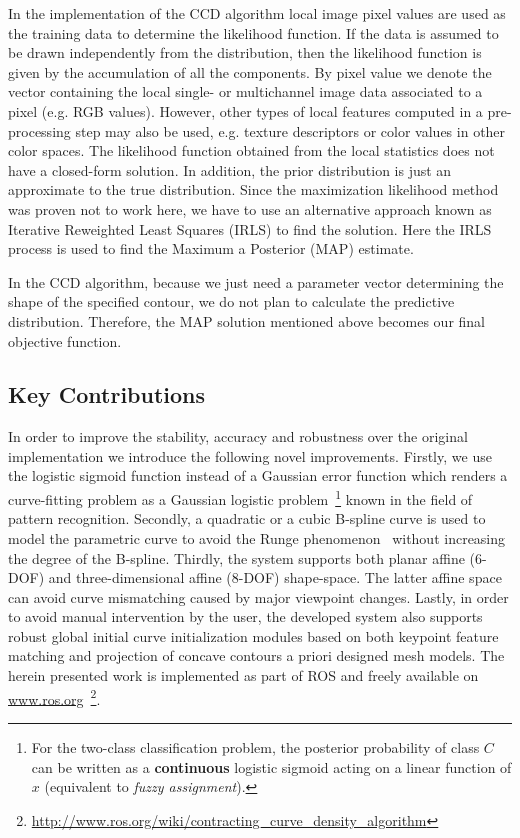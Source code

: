\documentclass[conference]{IEEEtran}
\begin{document}
In the implementation of the CCD algorithm local image pixel values are used
as the training data to determine the likelihood function. If the data is 
assumed to be drawn independently from the distribution, then the likelihood 
function is given by the accumulation of all the components.
By pixel value we denote the vector containing the local single- or multichannel
image data associated to a pixel (e.g. RGB values). 
However, other types of local features computed in a pre-processing
step may also be used, e.g. texture descriptors or color values in
other color spaces. The likelihood function obtained from the local statistics does
not have a closed-form solution. In addition, the prior distribution is just
an approximate to the true distribution. Since the maximization
likelihood method was proven \cite{bishop2006pattern} not to work here, we have to use an alternative
approach known as Iterative Reweighted Least Squares (IRLS) to find
the solution. Here the IRLS process is used to find the Maximum a Posterior (MAP)
estimate.

In the CCD algorithm, because we just need a parameter vector determining
the shape of the specified contour, we do not plan to calculate the
predictive distribution. Therefore, the MAP solution mentioned above
becomes our final objective function.


\subsection{Key Contributions}
In order to improve the stability, accuracy and robustness over the original
implementation we introduce the following novel improvements. Firstly, we use 
the logistic sigmoid function instead of a Gaussian error function which renders a
curve-fitting problem as a Gaussian logistic problem~\footnote{For the two-class
classification problem, the posterior probability 
of class $C$ can be written as a \textbf{continuous} logistic sigmoid acting
on a linear function of $x$ (equivalent to \textit{fuzzy assignment}).} known in the field of pattern 
recognition. Secondly, a quadratic or
a cubic B-spline curve is used to model the parametric curve
to avoid the Runge phenomenon~\cite{süli2003introduction} without increasing the degree of the
B-spline. Thirdly, the system supports both planar affine (6-DOF) and
three-dimensional affine (8-DOF) shape-space. The latter affine space can avoid
curve mismatching caused by major viewpoint changes. Lastly, in
order to avoid manual intervention by the user, the developed system
also supports robust global initial curve initialization modules based on both keypoint
feature matching and projection of concave contours a priori designed mesh models.
The herein presented work is implemented as part of ROS and freely 
available on \url{www.ros.org}~\footnote{\url{http://www.ros.org/wiki/contracting_curve_density_algorithm}}.
\end{document}
